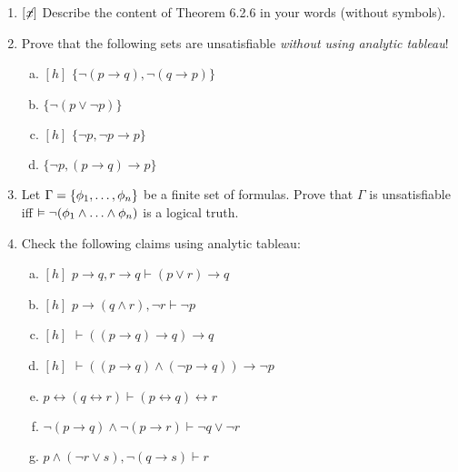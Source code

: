 	\begin{enumerate}[\thesection.1]
	
		\item {$[\not\hspace{-.5ex}x]$} Describe the content of Theorem 6.2.6 in your  words (without symbols).
		
		\item Prove that the following sets are unsatisfiable \emph{without using analytic tableau}!
		
		\begin{enumerate}[(a)]
		
		
			\item $[h]$ $\{\neg (p\to q), \neg (q\to p)\}$
			
			\item $\{\neg (p\lor \neg p)\}$
			
			\item $[h]$ $\{\neg p, \neg p\to p\}$
			
			\item $\{\neg p, (p\to q)\to p\}$
		
		
		\end{enumerate}
		
		\item Let $\Gamma=\{\phi_1, \mathellipsis,\phi_n\}$ be a finite set of formulas. Prove that $\Gamma$ is unsatisfiable iff $\vDash \neg (\phi_1\land\mathellipsis\land\phi_n)$ is a logical truth.
	
		\item Check the following claims using analytic tableau:
		
		\begin{enumerate}[(a)]

			\item $[h]$ $p\to q, r\to q\vdash (p\lor r)\to q$

			\item $[h]$ $p\to (q\land r), \neg r\vdash \neg p$

			\item $[h]$ $\vdash((p\to q)\to q)\to q$

			\item $[h]$ $\vdash((p\to q)\land (\neg p\to q))\to \neg p$

\item $p\leftrightarrow (q\leftrightarrow r)\vdash (p\leftrightarrow q)\leftrightarrow r$

\item $\neg(p\to q)\land \neg(p\to r)\vdash \neg q\lor \neg r$

\item $p\land (\neg r\lor s), \neg (q\to s)\vdash r$


\end{enumerate}
\end{enumerate}
